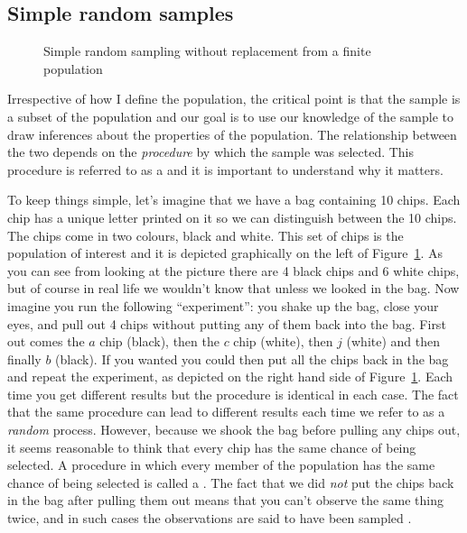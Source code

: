 \subsection{Simple random samples}

\begin{figure}[t]
\begin{center}
\end{center}
\caption{Simple random sampling without replacement from a finite population}
\label{fig:srs1}
\end{figure}

Irrespective of how I define the population, the critical point is that the sample is a subset of the population and our goal is to use our knowledge of the sample to draw inferences about the properties of the population. The relationship between the two depends on the {\it procedure} by which the sample was selected. This procedure is referred to as a  and it is important to understand why it matters.

To keep things simple, let's imagine that we have a bag containing 10 chips. Each chip has a unique letter printed on it so we can distinguish between the 10 chips. The chips come in two colours, black and white. This set of chips is the population of interest and it is depicted graphically on the left of Figure~\ref{fig:srs1}. As you can see from looking at the picture there are 4 black chips and 6 white chips, but of course in real life we wouldn't know that unless we looked in the bag. Now imagine you run the following ``experiment'': you shake up the bag, close your eyes, and pull out 4 chips without putting any of them back into the bag. First out comes the $a$ chip (black), then the $c$ chip (white), then $j$ (white) and then finally $b$ (black). If you wanted you could then put all the chips back in the bag and repeat the experiment, as depicted on the right hand side of Figure~\ref{fig:srs1}. Each time you get different results but the procedure is identical in each case. The fact that the same procedure can lead to different results each time we refer to as a {\it random} process. However, because we shook the bag before pulling any chips out, it seems reasonable to think that every chip has the same chance of being selected. A procedure in which every member of the population has the same chance of being selected is called a . The fact that we did {\it not} put the chips back in the bag after pulling them out means that you can't observe the same thing twice, and in such cases the observations are said to have been sampled . 

